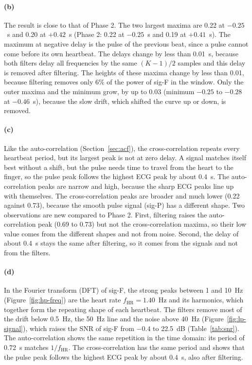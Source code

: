 \documentclass[11pt,a4paper]{article}
\newcommand{\chg}[1]{{\color{blue}#1}}
\begin{document}
\paragraph{(b)} The result is close to that of Phase 2. The two largest maxima are 0.22 at
$-0.25$~s and 0.20 at $+0.42$~s (Phase 2: 0.22 at $-0.25$~s and 0.19 at $+0.41$~s). The maximum at
negative delay is the pulse of the previous beat, since a pulse cannot come before its own
heartbeat. The delays change by less than 0.01~s, because both filters delay all frequencies by the
same $(K-1)/2$ samples and this delay is removed after filtering. The heights
of these maxima change by less than 0.01, because filtering removes only 6\% of the power of sig-F
in the window. Only the outer maxima and the minimum grow, by up to 0.03 (minimum $-0.25$ to
$-0.28$ at $-0.46$~s), because the slow drift, which shifted the curve up or down, is removed.

\paragraph{(c)} Like the auto-correlation (Section~\ref{sec:acf}), the cross-correlation
repeats every heartbeat period, but its largest peak is not at zero delay. A signal matches itself
best without a shift, but the pulse needs time to travel from the heart to the finger, so the
pulse peak follows the highest ECG peak by about 0.4~s. The auto-correlation peaks are narrow and
high, because the sharp ECG peaks line up with themselves. The cross-correlation peaks are broader
and much lower (0.22 against 0.73), because the smooth pulse signal (sig-P) has a different shape.
Two observations are new compared to Phase 2. First, filtering raises the auto-correlation peak (0.69
to 0.73) but not the cross-correlation maxima, so their low value comes from the different shapes
and not from noise. Second, the delay of about 0.4~s stays the same after filtering, so it comes
from the signals and not from the filters.

\paragraph{(d)} \chg{In the Fourier transform (DFT) of sig-F, the} strong peaks between 1 and 10~Hz (Figure~\ref{fig:hp-freq}) are
the heart rate $f_\mathrm{HR} = 1.40$~Hz and its harmonics, which together form the repeating shape
of each heartbeat. The filters remove most of the drift below 0.5~Hz, the 50~Hz line and the noise
above 40~Hz (Figure~\ref{fig:lp-signal}), which raises the SNR of sig-F from $-0.4$ to 22.5~dB
(Table~\ref{tab:snr}). The auto-correlation shows the same repetition in the time domain: its
period of 0.72~s matches $1/f_\mathrm{HR}$. The cross-correlation has the same period and shows
that the pulse peak follows the highest ECG peak by about 0.4~s, also after filtering.
\end{document}
